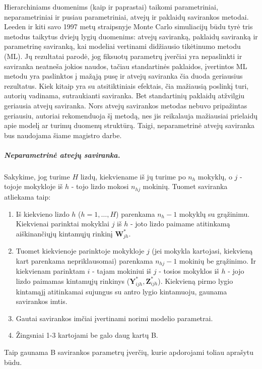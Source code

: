 \documentclass[11pt,a4paper]{article}
\begin{document}
\indent Hierarchiniams duomenims (kaip ir paprastai) taikomi parametriniai, neparametriniai ir pusiau parametriniai, atvejų ir paklaidų savirankos metodai. Leeden ir kiti \cite{bootML} savo 1997 metų straipsnyje Monte Carlo simuliacijų būdu tyrė tris metodus taikytus dviejų lygių duomenims: atvejų saviranką, paklaidų saviranką ir parametrinę saviranką, kai modeliai vertinami didžiausio tikėtinumo metodu (ML). Jų rezultatai parodė, jog fiksuotų parametrų įverčiai yra nepaslinkti ir saviranka neatneša jokios naudos, tačiau standartinės paklaidos, įvertintos ML metodu yra paslinktos į mažąją pusę ir atvejų saviranka čia duoda geriausius rezultatus. Kiek kitaip yra su atsitiktiniais efektais, čia mažiausią poslinkį turi, autorių vadinama, sutraukianti saviranka. Bet standartinių paklaidų atžvilgiu geriausia atvejų saviranka. Nors atvejų savirankos metodas nebuvo pripažintas geriausiu, autoriai rekomenduoja šį metodą, nes jis reikalauja mažiausiai prielaidų apie modelį ar turimų duomenų struktūrą. Taigi, neparametrinė atvejų saviranka bus naudojama šiame magistro darbe.


\subparagraph{Neparametrinė atvejų saviranka.} Sakykime, jog turime $H$ lizdų, kiekviename iš jų turime po $n_h$ mokyklų, o $j$ - tojoje mokykloje iš $h$ - tojo lizdo mokosi $n_{hj}$ mokinių. Tuomet saviranka atliekama taip:
\begin{enumerate}
\item Iš kiekvieno lizdo $h$ ($h=1,\dots,H$) parenkama $n_h-1$ mokyklų su grąžinimu. Kiekvienai parinktai mokyklai $j$ iš $h$ - joto lizdo paimame atitinkamą aiškinančiųjų kintamųjų rinkinį $\mathbf{W}^*_{jh}$.
\item Tuomet kiekvienoje parinktoje mokykloje $j$ (jei mokykla kartojasi, kiekvieną kart parenkama nepriklausomai) parenkama $n_{hj}-1$ mokinių be grąžinimo. Ir kiekvienam parinktam $i$ - tajam mokiniui iš $j$ - tosios mokyklos iš $h$ - jojo lizdo paimamas kintamųjų rinkinys ($\mathbf{Y}^*_{ijh}, \mathbf{Z}^*_{ijh}$). Kiekvieną pirmo lygio kintamąjį atitinkamai sujungus su antro lygio kintamuoju, gaunama savirankos imtis.
\item Gautai savirankos imčiai įvertinami norimi modelio parametrai.
\item Žingsniai 1-3 kartojami be galo daug kartų B.
\end{enumerate}
Taip gaunama B savirankos parametrų įverčių, kurie apdorojami toliau aprašytu būdu. 
\end{document}
